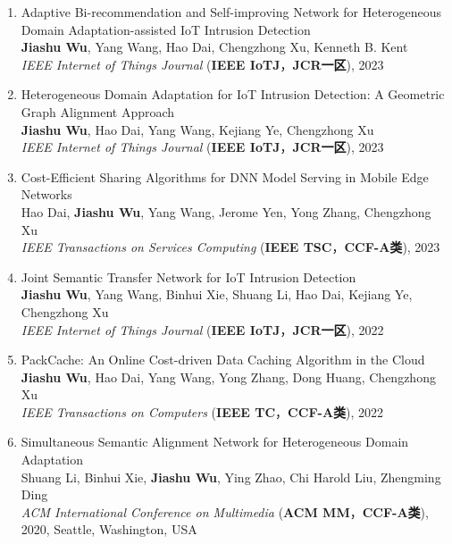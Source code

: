 \documentclass[UTF8,letterpaper,11pt]{article}
\begin{document}
\begin{enumerate}
  \item Adaptive Bi-recommendation and Self-improving Network for Heterogeneous Domain Adaptation-assisted IoT Intrusion Detection\\
  \textbf{Jiashu Wu}, Yang Wang\textsuperscript{\Letter}, Hao Dai, Chengzhong Xu, Kenneth B. Kent\\
  \textit{IEEE Internet of Things Journal} (\textbf{IEEE IoTJ}，\textbf{JCR一区}), 2023

  \item Heterogeneous Domain Adaptation for IoT Intrusion Detection: A Geometric Graph Alignment Approach\\
  \textbf{Jiashu Wu}, Hao Dai, Yang Wang\textsuperscript{\Letter}, Kejiang Ye, Chengzhong Xu\\
  \textit{IEEE Internet of Things Journal} (\textbf{IEEE IoTJ}，\textbf{JCR一区}), 2023

  \item Cost-Efficient Sharing Algorithms for DNN Model Serving in Mobile Edge Networks\\
  Hao Dai, \textbf{Jiashu Wu}, Yang Wang\textsuperscript{\Letter}, Jerome Yen, Yong Zhang, Chengzhong Xu\\
  \textit{IEEE Transactions on Services Computing} (\textbf{IEEE TSC}，\textbf{CCF-A类}), 2023

  \item Joint Semantic Transfer Network for IoT Intrusion Detection\\
  \textbf{Jiashu Wu}, Yang Wang\textsuperscript{\Letter}, Binhui Xie, Shuang Li, Hao Dai, Kejiang Ye, Chengzhong Xu\\
  \textit{IEEE Internet of Things Journal} (\textbf{IEEE IoTJ}，\textbf{JCR一区}), 2022

  \item PackCache: An Online Cost-driven Data Caching Algorithm in the Cloud\\
  \textbf{Jiashu Wu}, Hao Dai, Yang Wang\textsuperscript{\Letter}, Yong Zhang, Dong Huang, Chengzhong Xu\\
  \textit{IEEE Transactions on Computers} (\textbf{IEEE TC}，\textbf{CCF-A类}), 2022

  \item Simultaneous Semantic Alignment Network for Heterogeneous Domain Adaptation\\
  Shuang Li, Binhui Xie, \textbf{Jiashu Wu}, Ying Zhao, Chi Harold Liu\textsuperscript{\Letter}, Zhengming Ding\\
  \textit{ACM International Conference on Multimedia} (\textbf{ACM MM}，\textbf{CCF-A类}), 2020, Seattle, Washington, USA


\end{enumerate}
\end{document}
